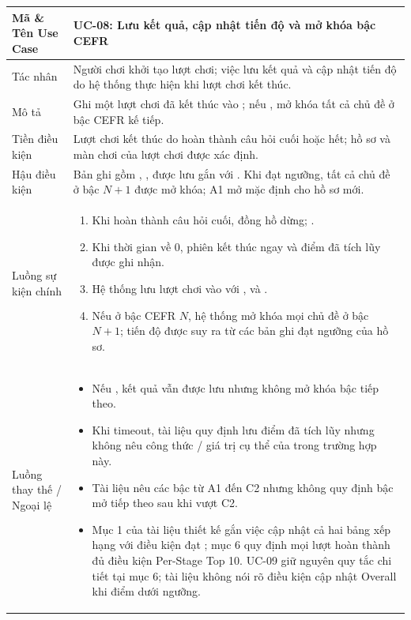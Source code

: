 \begin{xltabular}{\textwidth}{|L{3.3cm}|Y|}
\textbf{Mã \& Tên Use Case} & \textbf{UC-08: Lưu kết quả, cập nhật tiến độ và mở khóa bậc CEFR} \\ \hline
Tác nhân & Người chơi khởi tạo lượt chơi; việc lưu kết quả và cập nhật tiến độ do hệ thống thực hiện khi lượt chơi kết thúc. \\ \hline
Mô tả & Ghi một lượt chơi đã kết thúc vào ; nếu , mở khóa tất cả chủ đề ở bậc CEFR kế tiếp. \\ \hline
Tiền điều kiện & Lượt chơi kết thúc do hoàn thành câu hỏi cuối hoặc  hết; hồ sơ và màn chơi của lượt chơi được xác định. \\ \hline
Hậu điều kiện & Bản ghi gồm , ,  được lưu gắn với . Khi đạt ngưỡng, tất cả chủ đề ở bậc \(N+1\) được mở khóa; A1 mở mặc định cho hồ sơ mới. \\ \hline
Luồng sự kiện chính &
\begin{enumerate}[nosep,leftmargin=*]
    \item Khi hoàn thành câu hỏi cuối, đồng hồ dừng; .
    \item Khi thời gian về 0, phiên kết thúc ngay và điểm đã tích lũy được ghi nhận.
    \item Hệ thống lưu lượt chơi vào  với ,  và .
    \item Nếu  ở bậc CEFR \(N\), hệ thống mở khóa mọi chủ đề ở bậc \(N+1\); tiến độ được suy ra từ các bản ghi đạt ngưỡng của hồ sơ.
\end{enumerate} \\ \hline
Luồng thay thế / Ngoại lệ &
\begin{itemize}[nosep,leftmargin=*]
    \item Nếu , kết quả vẫn được lưu nhưng không mở khóa bậc tiếp theo.
    \item Khi timeout, tài liệu quy định lưu điểm đã tích lũy nhưng không nêu công thức / giá trị cụ thể của  trong trường hợp này.
    \item Tài liệu nêu các bậc từ A1 đến C2 nhưng không quy định bậc mở tiếp theo sau khi vượt C2.
    \item Mục 1 của tài liệu thiết kế gắn việc cập nhật cả hai bảng xếp hạng với điều kiện đạt ; mục 6 quy định mọi lượt hoàn thành đủ điều kiện Per-Stage Top 10. UC-09 giữ nguyên quy tắc chi tiết tại mục 6; tài liệu không nói rõ điều kiện cập nhật Overall khi điểm dưới ngưỡng.
\end{itemize} \\ \hline


\end{xltabular}
